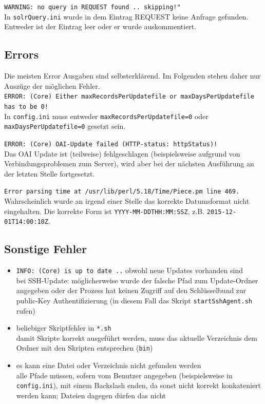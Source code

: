 \documentclass[10pt]{article}
\begin{document}
\texttt{WARNING: no query in REQUEST found .. skipping!"} \\
In \texttt{solrQuery.ini} wurde in dem Eintrag REQUEST keine Anfrage gefunden. Entweder ist der Eintrag leer oder er wurde auskommentiert.


\subsection{Errors}
Die meisten Error Ausgaben sind selbsterklärend. Im Folgenden stehen daher nur Auszüge der möglichen Fehler. \\

\texttt{ERROR: (Core) Either maxRecordsPerUpdatefile or maxDaysPerUpdatefile has to be 0!} \\
In \texttt{config.ini} muss entweder \texttt{maxRecordsPerUpdatefile=0} oder \texttt{maxDaysPerUpdatefile=0} gesetzt sein.

\texttt{ERROR: (Core) OAI-Update failed (HTTP-status: httpStatus)!} \\
Das OAI Update ist (teilweise) fehlgeschlagen (beispielsweise aufgrund von Verbindungsproblemen zum Server), wird aber bei der nächsten Ausführung an der letzten Stelle fortgesetzt.

\texttt{Error parsing time at /usr/lib/perl/5.18/Time/Piece.pm line 469.} \\
Wahrscheinlich wurde an irgend einer Stelle das korrekte Datumsformat nicht eingehalten. Die korrekte Form ist \texttt{YYYY-MM-DDTHH:MM:SSZ}, z.B. \texttt{2015-12-01T14:00:10Z}.

\subsection{Sonstige Fehler}
\begin{itemize}
	\item \texttt{INFO: (Core) is up to date ..} obwohl neue Updates vorhanden sind \\
		bei SSH-Update: möglicherweise wurde der falsche Pfad zum Update-Ordner angegeben oder der Prozess hat keinen Zugriff auf den Schlüsselbund zur public-Key Authentifizierung (in diesem Fall das Skript \texttt{startSshAgent.sh} rufen)
		
	\item beliebiger Skriptfehler in \texttt{*.sh} \\
		damit Skripte korrekt ausgeführt werden, muss das aktuelle Verzeichnis dem Ordner mit den Skripten entsprechen (\texttt{bin})
		
	\item es kann eine Datei oder Verzeichnis nicht gefunden werden \\
		alle Pfade müssen, sofern vom Benutzer angegeben (beispielsweise in \texttt{config.ini}), mit einem Backslash enden, da sonst nicht korrekt konkateniert werden kann; Dateien dagegen dürfen das nicht
\end{itemize}
\end{document}
